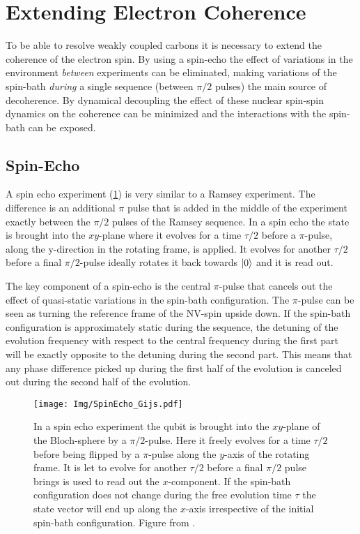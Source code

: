 \section{Extending Electron Coherence}

To be able to resolve weakly coupled carbons it is necessary to extend the coherence of the electron spin.
By using a spin-echo the effect of variations in the environment \emph{between} experiments can be eliminated, making variations of the spin-bath \emph{during} a single sequence (between $\pi/2$ pulses) the main source of decoherence.
By dynamical decoupling the effect of these nuclear spin-spin dynamics on the coherence can be minimized and the interactions with the spin-bath can be exposed.


\subsection{Spin-Echo}

A spin echo experiment (\cref{fig:spin_echo_gijs}) is very similar to a Ramsey experiment.
The difference is an additional $\pi$ pulse that is added in the middle of the experiment exactly between the $\pi/2$ pulses of the Ramsey sequence.
In a spin echo the state is brought into the $xy$-plane where it evolves for a time $\tau/2$ before a $\pi$-pulse, along the y-direction in the rotating frame, is applied.
It evolves for another $\tau/2$ before a final $\pi/2$-pulse ideally rotates it back towards ${\left\vert{0}\right\rangle}$ and it is read out.

The key component of a spin-echo is the central $\pi$-pulse that cancels out the effect of quasi-static variations in the spin-bath configuration.
The $\pi$-pulse can be seen as turning the reference frame of the NV-spin upside down.
If the spin-bath configuration is approximately static during the sequence, the detuning of the evolution frequency with respect to the central frequency during the first part will be exactly opposite to the detuning during the second part.
This means that any phase difference picked up during the first half of the evolution is canceled out during the second half of the evolution.
\begin{figure}[htbp]
    \centering
    \texttt{[image: Img/SpinEcho\_Gijs.pdf]}
    \caption{In a spin echo experiment the qubit is brought into the $xy$-plane of the Bloch-sphere by a $\pi/2$-pulse. Here it freely evolves for a time $\tau/2$ before being flipped by a $\pi$-pulse along the $y$-axis of the rotating frame. It is let to evolve for another $\tau/2$ before a final $\pi/2$ pulse brings is used to read out the $x$-component.
    If the spin-bath configuration does not change during the free evolution time $\tau$ the state vector will end up along the $x$-axis irrespective of the initial spin-bath configuration.
    Figure from \citet{Lange2012Quantum}. }
    \label{fig:spin_echo_gijs}
\end{figure}


